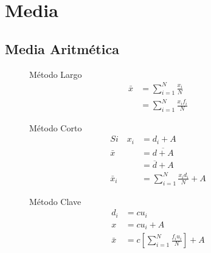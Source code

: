 \section{Media}

\subsection{Media Aritmética}

\begin{figure}[!h]

\begin{minipage}[t]{0.3\textwidth}
	Método Largo
	\begin{align*}
	\bar { x } 	& =\sum _{ i=1 }^{ N }{ \frac { { x }_{ i } }{ N }  } 			\\
				& =\sum _{ i=1 }^{ N }{ \frac { { x }_{ i }{ f }_{ i } }{ N }  } 
	\end{align*}
\end{minipage} \hfill \begin{minipage}[t]{0.3\textwidth}
	Método Corto
	\begin{align*}
	Si \quad {x}_{i}	& ={ d }_{ i }+A 				\\
		\bar{x}			& =\overline {d+A} 				\\
						& =\overline {d}+A 				\\
		\bar {x}_{i}	& =\sum _{ i=1 }^{ N }{ \frac { { x }_{ i }{ d }_{ i } }{ N } + A  }
	\end{align*}
\end{minipage} \hfill \begin{minipage}[t]{0.3\textwidth}
	Método Clave
	\begin{align*}
	{d}_{i}				& =c{u}_{i}						\\
				x		& =c{u}_{i} + A					\\
				\bar{x} & =c\left[ \sum _{ i=1 }^{ N }{ \frac { { f }_{ i }{ u }_{ i } }{ N }  }  \right] +A
	\end{align*}

\end{minipage}
\end{figure}


